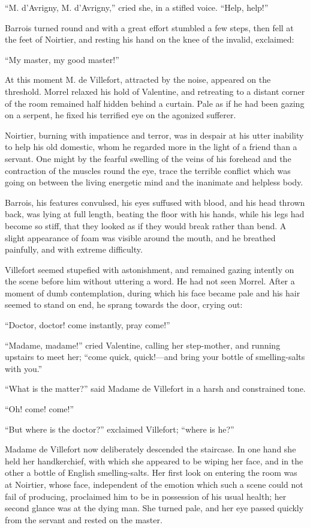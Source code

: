 “M. d’Avrigny, M. d’Avrigny,” cried she, in a stifled voice. “Help,
help!”

Barrois turned round and with a great effort stumbled a few steps, then
fell at the feet of Noirtier, and resting his hand on the knee of the
invalid, exclaimed:

“My master, my good master!”

At this moment M. de Villefort, attracted by the noise, appeared on the
threshold. Morrel relaxed his hold of Valentine, and retreating to a
distant corner of the room remained half hidden behind a curtain. Pale
as if he had been gazing on a serpent, he fixed his terrified eye on
the agonized sufferer.

Noirtier, burning with impatience and terror, was in despair at his
utter inability to help his old domestic, whom he regarded more in the
light of a friend than a servant. One might by the fearful swelling of
the veins of his forehead and the contraction of the muscles round the
eye, trace the terrible conflict which was going on between the living
energetic mind and the inanimate and helpless body.

Barrois, his features convulsed, his eyes suffused with blood, and his
head thrown back, was lying at full length, beating the floor with his
hands, while his legs had become so stiff, that they looked as if they
would break rather than bend. A slight appearance of foam was visible
around the mouth, and he breathed painfully, and with extreme
difficulty.

Villefort seemed stupefied with astonishment, and remained gazing
intently on the scene before him without uttering a word. He had not
seen Morrel. After a moment of dumb contemplation, during which his
face became pale and his hair seemed to stand on end, he sprang towards
the door, crying out:

“Doctor, doctor! come instantly, pray come!”

“Madame, madame!” cried Valentine, calling her step-mother, and running
upstairs to meet her; “come quick, quick!—and bring your bottle of
smelling-salts with you.”

“What is the matter?” said Madame de Villefort in a harsh and
constrained tone.

“Oh! come! come!”

“But where is the doctor?” exclaimed Villefort; “where is he?”

Madame de Villefort now deliberately descended the staircase. In one
hand she held her handkerchief, with which she appeared to be wiping
her face, and in the other a bottle of English smelling-salts. Her
first look on entering the room was at Noirtier, whose face,
independent of the emotion which such a scene could not fail of
producing, proclaimed him to be in possession of his usual health; her
second glance was at the dying man. She turned pale, and her eye passed
quickly from the servant and rested on the master.

